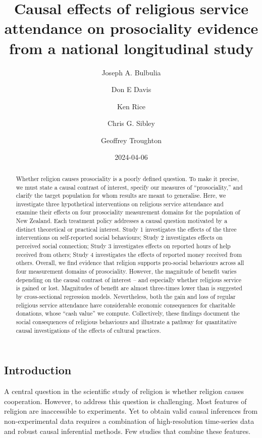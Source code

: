 \documentclass[
  single column]{article}
\title{Causal effects of religious service attendance on prosociality
evidence from a national longitudinal study}
\author{Joseph A. Bulbulia \and Don E Davis \and Ken Rice \and Chris G.
Sibley \and Geoffrey Troughton}
\date{2024-04-06}
\begin{document}
\maketitle
\begin{abstract}
Whether religion causes prosociality is a poorly defined question. To
make it precise, we must state a causal contrast of interest, specify
our measures of ``prosociality,'' and clarify the target population for
whom results are meant to generalise. Here, we investigate three
hypothetical interventions on religious service attendance and examine
their effects on four prosociality measurement domains for the
population of New Zealand. Each treatment policy addresses a causal
question motivated by a distinct theoretical or practical interest.
Study 1 investigates the effects of the three interventions on
self-reported social behaviours; Study 2 investigates effects on
perceived social connection; Study 3 investigates effects on reported
hours of help received from others; Study 4 investigates the effects of
reported money received from others. Overall, we find evidence that
religion supports pro-social behaviours across all four measurement
domains of prosociality. However, the magnitude of benefit varies
depending on the causal contrast of interest -- and especially whether
religious service is gained or lost. Magnitudes of benefit are almost
three-times lower than is suggested by cross-sectional regression
models. Nevertheless, both the gain and loss of regular religious
service attendance have considerable economic consequences for
charitable donations, whose ``cash value'' we compute. Collectively,
these findings document the social consequences of religious behaviours
and illustrate a pathway for quantitative causal investigations of the
effects of cultural practices.
\end{abstract}

\subsection{Introduction}\label{introduction}

A central question in the scientific study of religion is whether
religion causes cooperation. However, to address this question is
challenging. Most features of religion are inaccessible to experiments.
Yet to obtain valid causal inferences from non-experimental data
requires a combination of high-resolution time-series data and robust
causal inferential methods. Few studies that combine these features.
\end{document}
